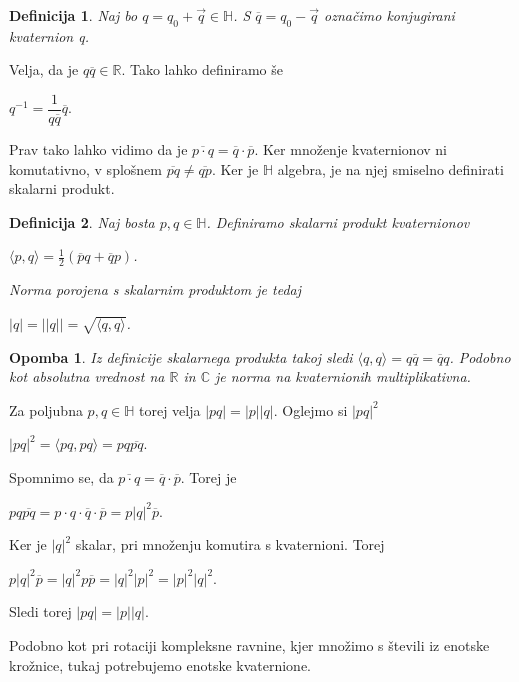 \documentclass[a4paper,12pt]{article}
\def\R{\mathbb{R}} %
\def\C{\mathbb{C}} %
\def\H{\mathbb{H}} %
\newtheorem{opomba}{Opomba}
\newtheorem{definicija}{Definicija}
\begin{document}

\begin{definicija}
Naj bo $q = q_{0} + \vec{q}\in \H$. S $\overline{q} = q_{0} -\vec{q}$ označimo \emph{konjugirani kvaternion} q.
\end{definicija}
Velja, da je $q\overline{q} \in \R$. Tako lahko definiramo še 
\begin{center}
   $q^{-1} = \dfrac{1}{q\overline{q}} \overline{q}$.
\end{center}
Prav tako lahko vidimo da je $\overline{p \cdot q} = \overline{q} \cdot \overline{p}$. Ker množenje kvaternionov ni komutativno,
v splošnem $\overline{pq} \neq \overline{qp}$. Ker je $\H$ algebra, je na njej smiselno definirati skalarni produkt.

\begin{definicija}
Naj bosta $p,q \in \H$. Definiramo skalarni produkt kvaternionov
\begin{center}
   $\langle p,q \rangle = \frac{1}{2} (\overline{p}q + \overline{q}p)$.
\end{center}
Norma porojena s skalarnim produktom je tedaj
\begin{center}
   $|q| = ||q|| = \sqrt{\langle q, q\rangle}$.
\end{center}
\end{definicija}

\begin{opomba}
Iz definicije skalarnega produkta takoj sledi $\langle q, q\rangle = q\overline{q} = \overline{q}q$.
Podobno kot absolutna vrednost na $\R$ in $\C$ je norma na kvaternionih multiplikativna.
\end{opomba}
Za poljubna $p,q \in \H$ torej velja $|pq| = |p||q|$. Oglejmo si $|pq|^2$
\begin{center}
   $|pq|^2 = \langle pq, pq \rangle = pq\overline{pq}$.
\end{center}
Spomnimo se, da $\overline{p \cdot q} = \overline{q} \cdot \overline{p}$. Torej je
\begin{center}
   $pq\overline{pq} = p\cdot q\cdot \overline{q} \cdot \overline{p} = p |q|^2 \overline{p}$.
\end{center}
Ker je $|q|^2$ skalar, pri množenju komutira s kvaternioni. Torej
\begin{center}
   $p|q|^2\overline{p} = |q|^2p\overline{p} = |q|^2 |p|^2 = |p|^2 |q|^2$.
\end{center}
Sledi torej $|pq| = |p||q|$.

Podobno kot pri rotaciji kompleksne ravnine, kjer množimo s števili iz enotske krožnice, tukaj potrebujemo 
enotske kvaternione.
\end{document}
